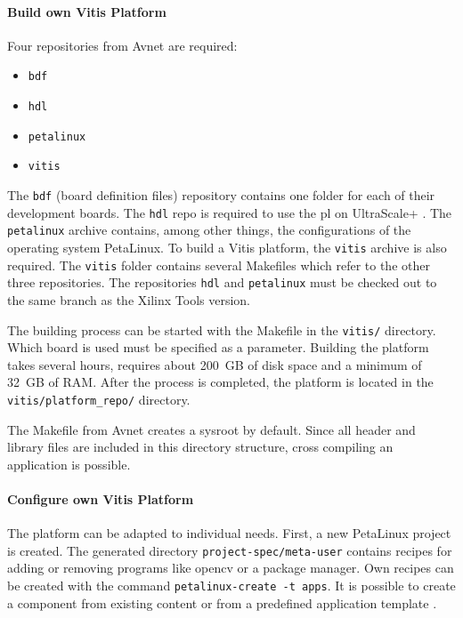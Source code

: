 \paragraph{Build own Vitis Platform}
Four repositories from Avnet are required:
\begin{itemize}
  \item \texttt{bdf}
  \item \texttt{hdl}
  \item \texttt{petalinux}
  \item \texttt{vitis}
\end{itemize}

The \texttt{bdf} (board definition files) repository contains one folder for each of their development boards.
The \texttt{hdl} repo is required to use the \acrfull{pl} on UltraScale+ .
The \texttt{petalinux} archive contains, among other things, the configurations of the operating system PetaLinux.
To build a Vitis platform, the \texttt{vitis} archive is also required.
The \texttt{vitis} folder contains several Makefiles which refer to the other three repositories.
The repositories \texttt{hdl} and \texttt{petalinux} must be checked out to the same branch as the Xilinx Tools version.

The building process can be started with the Makefile in the \texttt{vitis/} directory.
Which board is used must be specified as a parameter.
Building the platform takes several hours, requires about \SI{200}{GB} of disk space and a minimum of \SI{32}{GB} of RAM.
After the process is completed, the platform is located in the \texttt{vitis/platform\_repo/} directory.

The Makefile from Avnet creates a sysroot by default.
Since all header and library files are included in this directory structure, cross compiling an application is possible.

\paragraph{Configure own Vitis Platform}
The platform can be adapted to individual needs.
First, a new PetaLinux project is created.
The generated directory \texttt{project-spec/meta-user} contains recipes for adding or removing programs like \acrshort{opencv} or a package manager.
Own recipes can be created with the command \texttt{petalinux-create -t apps}.
It is possible to create a component from existing content or from a predefined application template \cite{petalinux_commandline_guide}.

